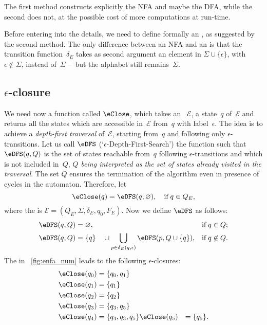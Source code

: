 The first method constructs explicitly the NFA and maybe the DFA,
while the second does not, at the possible cost of more computations
at run-time.

Before entering into the details, we need to define formally an \eNFA,
as suggested by the second method. The only difference between an NFA
and an \eNFA is that the transition function~\(\delta_E\) takes as
second argument an element in \(\Sigma \cup \{\epsilon\}\), with
\(\epsilon \not\in \Sigma\), instead of~\(\Sigma\) --~but the alphabet
still remains~\(\Sigma\).

\subsection*{$\epsilon$-closure}

We need now a function called \emph{\(\eClose\)}, which takes an
\eNFA~\(\mathcal{E}\), a state~\(q\) of~\(\mathcal{E}\) and returns
all the states which are accessible in~\(\mathcal{E}\) from~\(q\) with
label~\(\epsilon\). The idea is to achieve a \emph{depth-first
  traversal} of~\(\mathcal{E}\), starting from~\(q\) and following
only \(\epsilon\)-transitions. Let us call \(\eDFS\)
(`\(\epsilon\)-Depth-First-Search') the function such that \(\eDFS(q,
Q)\) is the set of states reachable from~\(q\) following
\(\epsilon\)-transitions and which is not included in~\(Q\),
\emph{\(Q\) being interpreted as the set of states already visited in
  the traversal}. The set \(Q\) ensures the termination of the
algorithm even in presence of cycles in the automaton. Therefore, let
\begin{equation*}
\eClose (q) = \eDFS (q, \varnothing), \quad \text{if} \; q \in Q_E,
\end{equation*}
where the \eNFA is \(\mathcal{E} = (Q_E, \Sigma, \delta_E, q_0,
F_E)\). Now we define \(\eDFS\) as follows:
\begin{align}
   \eDFS (q, Q)
&= \varnothing,
& \text{if} \; q \in Q; \label{eDFS_1}\\
  \eDFS (q, Q)
&= \{q\} \quad \cup \bigcup_{p \in \delta_E(q,\epsilon)}{\eDFS (p, Q
    \cup \{q\})},
& \text{if} \; q \not\in Q. \label{eDFS_2}
\end{align}
The \eNFA in \fig~\vref{fig:enfa_num} leads to the following
\(\epsilon\)-closures:
\begin{align*}
    \eClose (q_0) &= \{q_0, q_1\}\\
    \eClose (q_1) &= \{q_1\}\\
    \eClose (q_2) &= \{q_2\}\\
    \eClose (q_3) &= \{q_3, q_5\}\\
    \eClose (q_4) &= \{q_4, q_3, q_5\}
    \eClose (q_5) &= \{q_5\}.
\end{align*}

